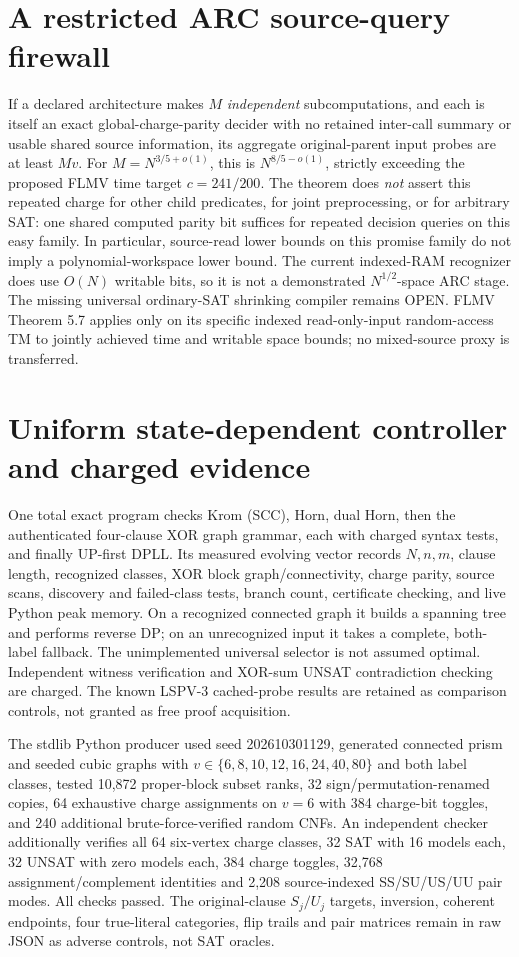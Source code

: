 \documentclass[11pt]{article}
\begin{document}
\section{A restricted ARC source-query firewall}
If a declared architecture makes $M$ \emph{independent} subcomputations, and each is itself an exact global-charge-parity decider with no retained inter-call summary or usable shared source information, its aggregate original-parent input probes are at least $Mv$. For $M=N^{3/5+o(1)}$, this is $N^{8/5-o(1)}$, strictly exceeding the proposed FLMV time target $c=241/200$. The theorem does \emph{not} assert this repeated charge for other child predicates, for joint preprocessing, or for arbitrary SAT: one shared computed parity bit suffices for repeated decision queries on this easy family. In particular, source-read lower bounds on this promise family do not imply a polynomial-workspace lower bound. The current indexed-RAM recognizer does use $O(N)$ writable bits, so it is not a demonstrated $N^{1/2}$-space ARC stage. The missing universal ordinary-SAT shrinking compiler remains OPEN. FLMV Theorem 5.7 applies only on its specific indexed read-only-input random-access TM to jointly achieved time and writable space bounds; no mixed-source proxy is transferred.

\section{Uniform state-dependent controller and charged evidence}
One total exact program checks Krom (SCC), Horn, dual Horn, then the authenticated four-clause XOR graph grammar, each with charged syntax tests, and finally UP-first DPLL. Its measured evolving vector records $N,n,m$, clause length, recognized classes, XOR block graph/connectivity, charge parity, source scans, discovery and failed-class tests, branch count, certificate checking, and live Python peak memory. On a recognized connected graph it builds a spanning tree and performs reverse DP; on an unrecognized input it takes a complete, both-label fallback. The unimplemented universal selector is not assumed optimal. Independent witness verification and XOR-sum UNSAT contradiction checking are charged. The known LSPV-3 cached-probe results are retained as comparison controls, not granted as free proof acquisition.

The stdlib Python producer used seed 202610301129, generated connected prism and seeded cubic graphs with $v\in\{6,8,10,12,16,24,40,80\}$ and both label classes, tested 10,872 proper-block subset ranks, 32 sign/permutation-renamed copies, 64 exhaustive charge assignments on $v=6$ with 384 charge-bit toggles, and 240 additional brute-force-verified random CNFs. An independent checker additionally verifies all 64 six-vertex charge classes, 32 SAT with 16 models each, 32 UNSAT with zero models each, 384 charge toggles, 32,768 assignment/complement identities and 2,208 source-indexed SS/SU/US/UU pair modes. All checks passed. The original-clause $S_j/U_j$ targets, inversion, coherent endpoints, four true-literal categories, flip trails and pair matrices remain in raw JSON as adverse controls, not SAT oracles.
\end{document}
